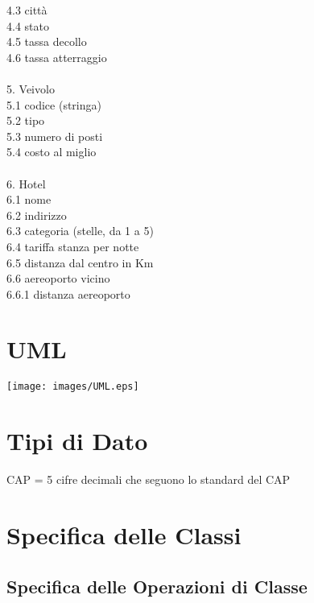 \documentclass[12pt, letterpaper]{article}
\newcommand{\acc}{\\\hphantom{}\\}
\newcommand{\id}{{\hphantom{ident}}}
\begin{document}
\id 4.3 città \\
\id 4.4 stato \\
\id 4.5 tassa decollo \\ 
\id 4.6 tassa atterraggio \acc 
5. Veivolo \\ 
\id 5.1 codice (stringa) \\
\id 5.2 tipo \\ 
\id 5.3 numero di posti \\ 
\id 5.4 costo al miglio \acc 
6. Hotel\\ 
\id 6.1 nome \\ 
\id 6.2 indirizzo \\ 
\id 6.3 categoria (stelle, da 1 a 5) \\
\id 6.4 tariffa stanza per notte \\ 
\id 6.5 distanza dal centro in Km \\ 
\id 6.6 aereoporto vicino \\ 
\id \id 6.6.1 distanza aereoporto


\newpage 
\section{UML}
\begin{center}
    \texttt{[image: images/UML.eps]}
\end{center}

\newpage
\section{Tipi di Dato}
CAP = 5 cifre decimali che seguono lo standard del CAP

\newpage 
\section{Specifica delle Classi}
\subsection{Specifica delle Operazioni di Classe}
\end{document}
